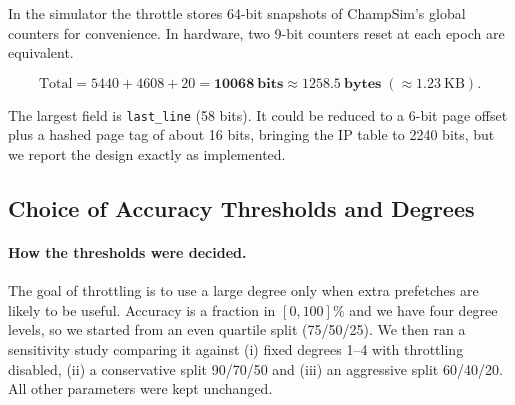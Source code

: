 \documentclass[11pt]{article}
\begin{document}
In the simulator the throttle stores 64-bit snapshots of ChampSim's global counters for
convenience. In hardware, two 9-bit counters reset at each epoch are equivalent.

\[
\text{Total} = 5440 + 4608 + 20 = \mathbf{10068\ bits} \approx \mathbf{1258.5\ bytes} \;(\approx 1.23\ \text{KB}).
\]

The largest field is \texttt{last\_line} (58 bits). It could be reduced to a 6-bit page
offset plus a hashed page tag of about 16 bits, bringing the IP table to 2240 bits, but we report
the design exactly as implemented.

\subsection{Choice of Accuracy Thresholds and Degrees}

\paragraph{How the thresholds were decided.}
The goal of throttling is to use a large degree only when extra prefetches are likely to be
useful. Accuracy is a fraction in $[0,100]\%$ and we have four degree levels, so we started
from an even quartile split (75/50/25). We then ran a sensitivity study comparing it
against (i) fixed degrees 1--4 with throttling disabled, (ii) a conservative split
90/70/50 and (iii) an aggressive split 60/40/20. All other parameters were kept unchanged.
\end{document}
